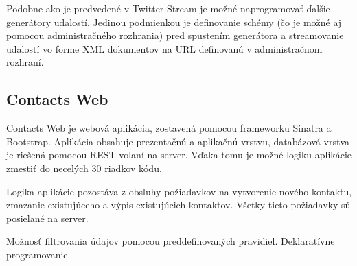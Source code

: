 	Podobne ako je predvedené v Twitter Stream je možné naprogramovať ďalšie generátory udalostí. Jedinou podmienkou je definovanie schémy (čo je možné aj pomocou administračného rozhrania) pred spustením generátora a streamovanie udalostí vo forme XML dokumentov na URL definovanú v administračnom rozhraní.
	
	\subsection{Contacts Web}
	Contacts Web je webová aplikácia, zostavená pomocou frameworku Sinatra a Bootstrap. Aplikácia obsahuje prezentačnú a aplikačnú vrstvu, databázová vrstva je riešená pomocou REST volaní na server. Vďaka tomu je možné logiku aplikácie zmestiť do necelých 30 riadkov kódu.
	
	Logika aplikácie pozostáva z obsluhy požiadavkov na vytvorenie nového kontaktu, zmazanie existujúceho a výpis existujúcich kontaktov. Všetky tieto požiadavky sú posielané na server.
	
	Možnosť filtrovania údajov pomocou preddefinovaných pravidiel.
	Deklaratívne programovanie.
	